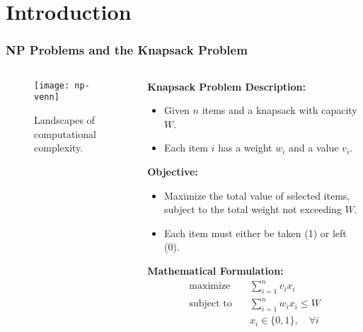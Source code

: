 \section{Introduction}
\begin{frame}
    \frametitle{NP Problems and the Knapsack Problem}

    \begin{columns}[T] %
        \begin{column}{0.5\textwidth}
            \begin{figure}
                \texttt{[image: np-venn]}
                \caption{Landscapes of computational complexity.}
                \label{fig:np-venn}
            \end{figure}
        \end{column}
        
        \begin{column}{0.5\textwidth}
            \textbf{Knapsack Problem Description:}
            \begin{itemize}
                \item Given $n$ items and a knapsack with capacity $W$.
                \item Each item $i$ has a weight $w_i$ and a value $v_i$.
            \end{itemize}
            
            \vspace{0.5em}
            
            \textbf{Objective:}
            \begin{itemize}
                \item Maximize the total value of selected items, subject to the total weight not exceeding $W$.
                \item Each item must either be taken (1) or left (0).
            \end{itemize}
            
            \vspace{0.5em}
            
            \textbf{Mathematical Formulation:}
            \begin{align*}
                \text{maximize} \quad & \sum_{i=1}^{n} v_i x_i \\
                \text{subject to} \quad & \sum_{i=1}^{n} w_i x_i \le W \\
                & x_i \in \{0, 1\}, \quad \forall i
            \end{align*}
        \end{column}

    \end{columns}
\end{frame}